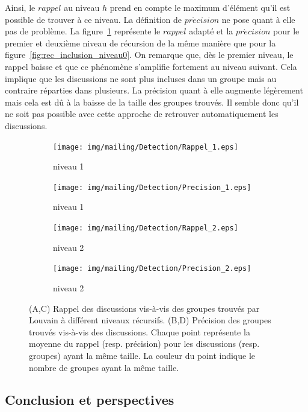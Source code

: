 Ainsi, le $rappel$ au niveau $h$ prend en compte le maximum d'élément qu'il est possible de trouver à ce niveau.
La définition de $pr\acute{e}cision$ ne pose quant à  elle pas de problème.
La figure~\ref{fig:rec_inclusion} représente le $rappel$ adapté et la $pr\acute{e}cision$ pour le premier et deuxième niveau de récursion de la même manière que pour la figure~\ref{fig:rec_inclusion_niveau0}.
On remarque que, dès le premier niveau, le rappel baisse et que ce phénomène s'amplifie fortement au niveau suivant.
Cela implique que les discussions ne sont plus incluses dans un groupe mais au contraire réparties dans plusieurs.
La précision quant à elle augmente légèrement mais cela est dû à la baisse de la taille des groupes trouvés.
Il semble donc qu'il ne soit pas possible avec cette approche de retrouver automatiquement les discussions.


\begin{figure} [h]
\centering

	\begin{subfigure}{0.45\textwidth}
		\texttt{[image: img/mailing/Detection/Rappel\_1.eps]}
		\caption{niveau 1}		
	\end{subfigure}
	\begin{subfigure}{0.45\textwidth}
		\texttt{[image: img/mailing/Detection/Precision\_1.eps]}
		\caption{niveau 1}		
	\end{subfigure}
	
	\begin{subfigure}{0.45\textwidth}
		\texttt{[image: img/mailing/Detection/Rappel\_2.eps]}
		\caption{niveau 2}		
	\end{subfigure}
	\begin{subfigure}{0.45\textwidth}
		\texttt{[image: img/mailing/Detection/Precision\_2.eps]}
		\caption{niveau 2}		
	\end{subfigure}

\caption{(A,C) Rappel des discussions vis-à-vis des groupes trouvés par Louvain à différent niveaux récursifs.
(B,D) Précision des groupes trouvés vis-à-vis des discussions.
Chaque point représente la moyenne du rappel (resp. précision) pour les discussions (resp. groupes) ayant la même taille.
La couleur du point indique le nombre de groupes ayant la même taille.
}
\label{fig:rec_inclusion}
\end{figure}

\subsection{Conclusion et perspectives}

